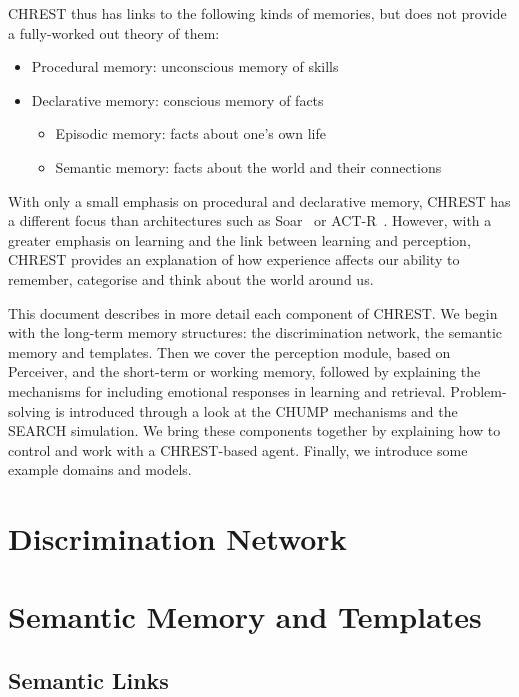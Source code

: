 \documentclass{article}
\begin{document}
CHREST thus has links to the following kinds of memories, but does not provide
a fully-worked out theory of them:

\begin{itemize}
\item Procedural memory: unconscious memory of skills
\item Declarative memory: conscious memory of facts
\begin{itemize}
\item Episodic memory: facts about one's own life
\item Semantic memory: facts about the world and their connections
\end{itemize}
\end{itemize}

With only a small emphasis on procedural and declarative memory, CHREST has a
different focus than architectures such as Soar~\cite{Laird12,Newell90} or
ACT-R~\cite{Anderson98}.  However, with a greater emphasis on learning and the 
link between learning and perception, CHREST provides an explanation of how 
experience affects our ability to remember, categorise and think about the 
world around us.

This document describes in more detail each component of CHREST.  We begin with
the long-term memory structures: the discrimination network, the semantic
memory and templates.  Then we cover the perception module, based on Perceiver,
and the short-term or working memory, followed by explaining the mechanisms for
including emotional responses in learning and retrieval.  Problem-solving is
introduced through a look at the CHUMP mechanisms and the SEARCH simulation.
We bring these components together by explaining how to control and work with a
CHREST-based agent.  Finally, we introduce some example domains and models.  

\section{Discrimination Network}


\section{Semantic Memory and Templates}

\subsection{Semantic Links}
\end{document}
